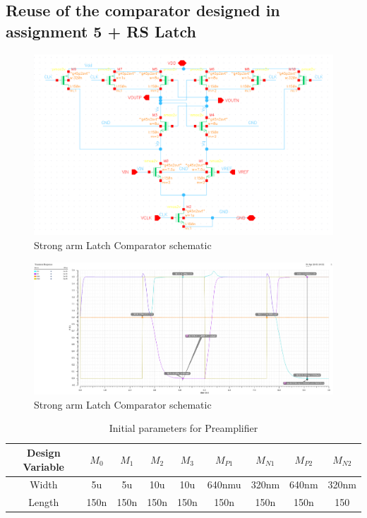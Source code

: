 \documentclass[a4paper,12pt]{article}
\begin{document}
\begin{itemize}
\subsection{Reuse of the comparator designed in assignment 5 + RS Latch}
\begin{figure}[H]
    \centering
    \includegraphics[max width = \textwidth]{Flash_ADC_images/SAL_sch.png}
    \caption{Strong arm Latch Comparator schematic}
    \label{fig:enter-label}
\end{figure}

\begin{figure}[H]
    \centering
    \includegraphics[max width = \textwidth]{Flash_ADC_images/SAL_out.png}
    \caption{Strong arm Latch Comparator schematic}
    \label{fig:enter-label}
\end{figure}

    \begin{table}[H]
        \centering
        \begin{tabular}{|c|c|c|c|c|c|c|c|c|}
        \hline
         Design Variable & $M_0$ & $M_1$ & $M_2$ & $M_3$ & $M_{P1}$ & $M_{N1}$ & $M_{P2}$ & $M_{N2}$ \\
         \hline
         Width & 5u & 5u & 10u & 10u & 640nmu & 320nm & 640nm & 320nm\\          
         \hline
         Length & 150n & 150n & 150n & 150n & 150n & 150n & 150n  & 150\\
         \hline
        \end{tabular}
        \caption{Initial parameters for Preamplifier}
        \label{tab:my_label}
    \end{table}


\end{itemize}
\end{document}
